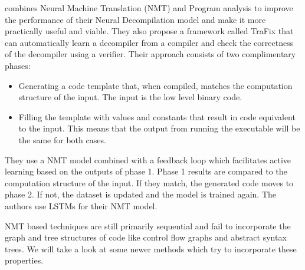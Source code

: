 \documentclass{article}
\begin{document}
\citet{katz2019towards} combines Neural Machine Translation (NMT) and Program analysis to improve the performance of their Neural Decompilation model and make it more practically useful and viable. They also propose a framework called TraFix that can automatically learn a decompiler from a compiler and check the correctness of the decompiler using a verifier. Their approach consists of two complimentary phases:
\begin{itemize}
    \item Generating a code template that, when compiled, matches the computation structure of
the input. The input is the low level binary code.
    \item Filling the template with values and constants that result in code equivalent to the input. This means that the output from running the executable will be the same for both cases.
\end{itemize}
They use a NMT model combined with a feedback loop which facilitates active learning based on the outputs of phase 1. Phase 1 results are compared to the computation structure of the input. If they match, the generated code moves to phase 2. If not, the dataset is updated and the model is trained again. The authors use LSTMs for their NMT model.

NMT based techniques are still primarily sequential and fail to incorporate the graph and tree structures of code like control flow graphs and abstract syntax trees. We will take a look at some newer methods which try to incorporate these properties.
\end{document}
